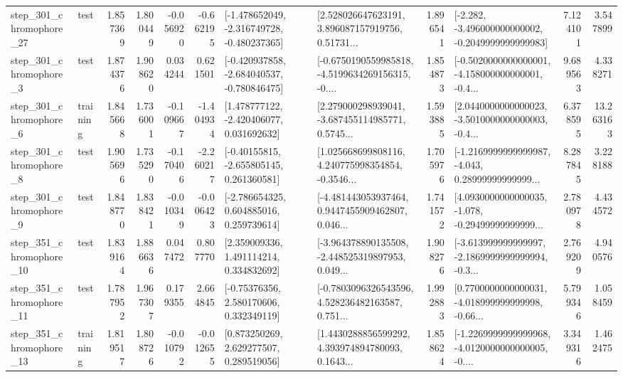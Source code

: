 \begin{tabular}{llrrrrllrlrr}
  step\_301\_chromophore\_27 &      test &      1.857369 &    1.800449 &     -0.056920 & -0.662195 &  [-1.478652049, -2.316749728, -0.480237365] &  [2.528026647623191, 3.896087157919756, 0.51731... &       1.896541 &  [-2.282, -3.496000000000002, -0.2049999999999983] &            7.124101 &          3.547899 \\
   step\_301\_chromophore\_3 &      test &      1.874376 &    1.908620 &      0.034244 &  0.621501 &  [-0.420937858, -2.684040537, -0.780846475] &  [-0.6750190559985818, -4.5199634269156315, -0.... &       1.854873 &  [-0.5020000000000001, -4.158000000000001, -0.4... &            9.689563 &          4.338271 \\
   step\_301\_chromophore\_6 &  training &      1.845668 &    1.736001 &     -0.109667 & -1.404934 &    [1.478777122, -2.420406077, 0.031692632] &  [2.279000298939041, -3.687455114985771, 0.5745... &       1.593885 &  [2.0440000000000023, -3.5010000000000003, -0.4... &            6.378595 &         13.263163 \\
   step\_301\_chromophore\_8 &      test &      1.905696 &    1.735290 &     -0.170406 & -2.260217 &    [-0.40155815, -2.655805145, 0.261360581] &  [1.025668699808116, 4.240775998354854, -0.3546... &       1.705976 &  [-1.2169999999999987, -4.043, 0.28999999999999... &            8.287845 &          3.228188 \\
   step\_301\_chromophore\_9 &      test &      1.848770 &    1.838421 &     -0.010349 & -0.006423 &    [-2.786654325, 0.604885016, 0.259739614] &  [-4.481443053937464, 0.9447455909462807, 0.046... &       1.741572 &  [4.0930000000000035, -1.078, -0.29499999999999... &            2.780978 &          4.434572 \\
  step\_351\_chromophore\_10 &      test &      1.839164 &    1.886636 &      0.047472 &  0.807770 &     [2.359009336, 1.491114214, 0.334832692] &  [-3.964378890135508, -2.448525319897953, 0.049... &       1.908276 &  [-3.613999999999997, -2.1869999999999994, -0.3... &            2.769209 &          4.940576 \\
  step\_351\_chromophore\_11 &      test &      1.787952 &    1.967307 &      0.179355 &  2.664845 &     [-0.75376356, 2.580170606, 0.332349119] &  [-0.7803096326543596, 4.528236482163587, 0.751... &       1.992883 &  [0.7700000000000031, -4.018999999999998, -0.66... &            5.799346 &          1.058459 \\
  step\_351\_chromophore\_13 &  training &      1.819517 &    1.808726 &     -0.010792 & -0.012655 &     [0.873250269, 2.629277507, 0.289519056] &  [1.4430288856599292, 4.393974894780093, 0.1643... &       1.858624 &  [-1.2269999999999968, -4.0120000000000005, -0.... &            3.349316 &          1.462475 \\

\end{tabular}
